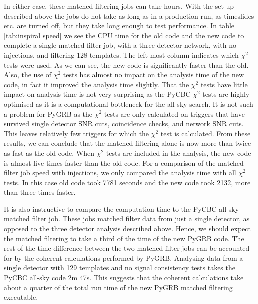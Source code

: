 \documentclass[11pt]{cuthesis}
\begin{document}
In either case, these matched filtering jobs can take hours. With the set up described above the jobs do not take as long as in a production run, as timeslides etc. are turned off, but they take long enough to test performance. In table \ref{tab:inspiral speed} we see the CPU time for the old code and the new code to complete a single matched filter job, with a three detector network, with no injections, and filtering 128 templates. The left-most column indicates which $\chi^2$ tests were used. As we can see, the new code is significantly faster than the old. Also, the use of $\chi^2$ tests has almost no impact on the analysis time of the new code, in fact it improved the analysis time slightly. That the $\chi^2$ tests have little impact on analysis time is not very surprising as the PyCBC $\chi^2$ tests are highly optimised as it is a computational bottleneck for the all-sky search. It is not such a problem for PyGRB as the $\chi^2$ tests are only calculated on triggers that have survived single detector SNR cuts, coincidence checks, and network SNR cuts. This leaves relatively few triggers for which the $\chi^2$ test is calculated. From these results, we can conclude that the matched filtering alone is now more than twice as fast as the old code. When $\chi^2$ tests are included in the analysis, the new code is almost five times faster than the old code. For a comparison of the matched filter job speed with injections, we only compared the analysis time with all $\chi^2$ tests. In this case old code took 7781 seconds and the new code took 2132, more than three times faster. 

It is also instructive to compare the computation time to the PyCBC all-sky matched filter job. These jobs matched filter data from just a single detector, as opposed to the three detector analysis described above. Hence, we should expect the matched filtering to take a third of the time of the new PyGRB code. The rest of the time difference between the two matched filter jobs can be accounted for by the coherent calculations performed by PyGRB. Analysing data from a single detector with 129 templates and no signal consistency tests takes the PyCBC all-sky code 2m 47s. This suggests that the coherent calculations take about a quarter of the total run time of the new PyGRB matched filtering executable.
\end{document}

